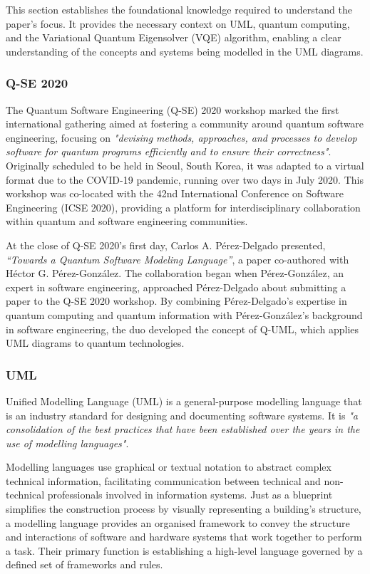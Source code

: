 \documentclass{article}
\begin{document}
{This section establishes the foundational knowledge required to understand the paper's focus. It provides the necessary context on UML, quantum computing, and the Variational Quantum Eigensolver (VQE) algorithm, enabling a clear understanding of the concepts and systems being modelled in the UML diagrams.

\subsubsection{Q-SE 2020}

The Quantum Software Engineering (Q-SE) 2020 workshop marked the first international gathering aimed at fostering a community around quantum software engineering, focusing on \textit{"devising methods, approaches, and processes to develop software for quantum programs efficiently and to ensure their correctness"}\cite{QSE2020}. Originally scheduled to be held in Seoul, South Korea, it was adapted to a virtual format due to the COVID-19 pandemic, running over two days in July 2020. This workshop was co-located with the 42nd International Conference on Software Engineering (ICSE 2020), providing a platform for interdisciplinary collaboration within quantum and software engineering communities.

At the close of Q-SE 2020's first day, Carlos A. Pérez-Delgado presented, \textit{“Towards a Quantum Software Modeling Language”}\cite{Perez-Delgado2020}, a paper co-authored with Héctor G. Pérez-González. The collaboration began when Pérez-González, an expert in software engineering, approached Pérez-Delgado about submitting a paper to the Q-SE 2020 workshop. By combining Pérez-Delgado's expertise in quantum computing and quantum information with Pérez-González's background in software engineering, the duo developed the concept of Q-UML, which applies UML diagrams to quantum technologies\cite{Towards}.

\subsubsection{UML}

Unified Modelling Language (UML) is a general-purpose modelling language that is an industry standard for designing and documenting software systems. It is \textit{"a consolidation of the best practices that have been established over the years in the use of modelling languages"}\cite{Seidl_Scholz_Huemer_Kappel_Duffy_2014}.

Modelling languages use graphical or textual notation to abstract complex technical information, facilitating communication between technical and non-technical professionals involved in information systems. Just as a blueprint simplifies the construction process by visually representing a building’s structure, a modelling language provides an organised framework to convey the structure and interactions of software and hardware systems that work together to perform a task\cite{Seidl_Scholz_Huemer_Kappel_Duffy_2014}. Their primary function is establishing a high-level language governed by a defined set of frameworks and rules\cite{Modelinglanguagemean}.

}
\end{document}
